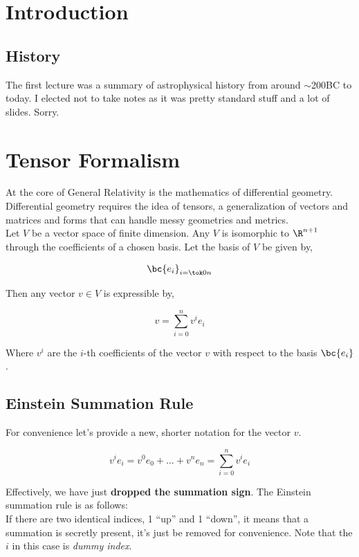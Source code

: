 \documentclass{article}
\begin{document}
\titlePage

\tableOfContents

\disclaimer


\section{Introduction}

\subsection{History}

The first lecture was a summary of astrophysical history from around $\sim$200BC to today. I elected not to take notes as it was pretty standard stuff and a lot of slides. Sorry.

\section{Tensor Formalism}

At the core of General Relativity is the mathematics of differential geometry. Differential geometry requires the idea of tensors, a generalization of vectors and matrices and forms that can handle messy geometries and metrics. \\

Let $V$ be a vector space of finite dimension. Any $V$ is isomorphic to $\R^{n+1}$ through the coefficients of a chosen basis. Let the basis of $V$ be given by,

\[ \bc{e_i}_{i=\tok0n} \]

Then any vector $v \in V$ is expressible by,

\[ v = \sum_{i=0}^{n} v^i e_i \]

Where $v^i$ are the $i$-th coefficients of the vector $v$ with respect to the basis $\bc{e_i}$.

\subsection{Einstein Summation Rule}

For convenience let's provide a new, shorter notation for the vector $v$.

\[ v^ie_i = v^0e_0 + \ldots + v^ne_n = \sum_{i=0}^nv^ie_i \]

Effectively, we have just \textbf{dropped the summation sign}. The Einstein summation rule is as follows: \\

If there are two identical indices, 1 ``up'' and 1 ``down'', it means that a summation is secretly present, it's just be removed for convenience. Note that the $i$ in this case is \textit{dummy index}.
\end{document}
